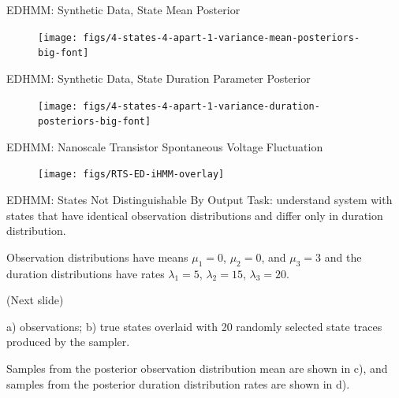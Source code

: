 \documentclass[xcolor=dvipsnames]{beamer}
\begin{document}
\begin{frame}[t]{EDHMM: Synthetic Data, State Mean Posterior}
	\begin{figure}[t]
		\begin{center}
			\texttt{[image: figs/4-states-4-apart-1-variance-mean-posteriors-big-font]}
		\end{center}
	\end{figure}
\end{frame}

\begin{frame}[t]{EDHMM: Synthetic Data, State Duration Parameter Posterior }
	\begin{figure}[t]
		\begin{center}
			\texttt{[image: figs/4-states-4-apart-1-variance-duration-posteriors-big-font]}
		\end{center}
	\end{figure}
\end{frame}



\begin{frame}[t]{EDHMM: Nanoscale Transistor Spontaneous Voltage Fluctuation}
	\begin{figure}[t]
		\begin{center}
			\texttt{[image: figs/RTS-ED-iHMM-overlay]}
		\end{center}
	\end{figure}
	\citep{Realov2010}
\end{frame}





\begin{frame}[t]{EDHMM:  States Not Distinguishable By Output}
Task: understand system with states that have identical observation distributions and differ only in  duration distribution. \newline

Observation distributions have means $\mu_1 = 0$, $\mu_2 = 0$, and $\mu_3 = 3$ and the duration distributions have rates $\lambda_1 = 5$, $\lambda_2 = 15$, $\lambda_3 = 20$. \newline 

(Next slide) \newline 

a) observations; b) true states overlaid with 20 randomly selected state traces produced by the sampler.  \newline

Samples from the posterior observation distribution mean are shown in c), and samples from the posterior duration distribution rates are shown in d).
\end{frame}
\end{document}
